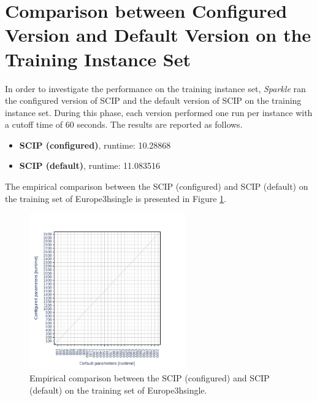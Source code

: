 \documentclass[british]{article}
\begin{document}
\vspace{5mm}


\section{Comparison between Configured Version and Default Version on the Training Instance Set}
In order to investigate the performance on the training instance set, \emph{Sparkle} ran the configured version of SCIP and the default version of SCIP on the training instance set. During this phase, each version performed one run per instance with a cutoff time of 60 seconds. The results are reported as follows.

\begin{itemize}
    \item \textbf{SCIP (configured)}, runtime: 10.28868
    \item \textbf{SCIP (default)}, runtime: 11.083516
\end{itemize}

The empirical comparison between the SCIP (configured) and SCIP (default) on the training set of Europe\textunderscore 3h\textunderscore single is presented in Figure \ref{fig:configured_vs_default_train}.

\begin{figure}[htbp]
\noindent \begin{centering}
\includegraphics[width=0.6\textwidth]{data_SCIP_configured_vs_default_on_Europe_3h_single}
\par\end{centering}

\caption{Empirical comparison between the SCIP (configured) and SCIP (default) on the training set of Europe\textunderscore 3h\textunderscore single.}\label{fig:configured_vs_default_train}
\end{figure}
\end{document}
